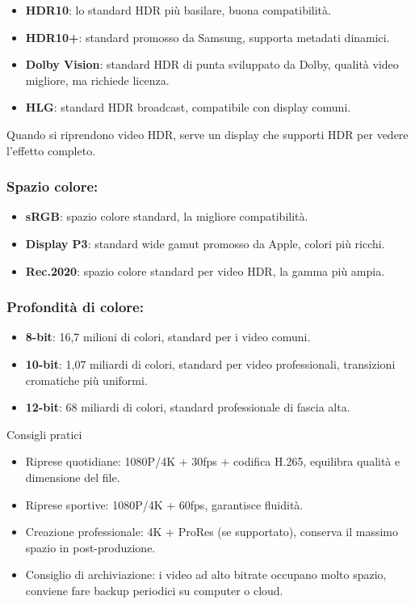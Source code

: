 \begin{itemize}
  \item \textbf{HDR10}: lo standard HDR più basilare, buona compatibilità.
  \item \textbf{HDR10+}: standard promosso da Samsung, supporta metadati dinamici.
  \item \textbf{Dolby Vision}: standard HDR di punta sviluppato da Dolby, qualità video migliore, ma richiede licenza.
  \item \textbf{HLG}: standard HDR broadcast, compatibile con display comuni.
\end{itemize}

Quando si riprendono video HDR, serve un display che supporti HDR per vedere l'effetto completo.


\subsubsection*{Spazio colore:}

\begin{itemize}
  \item \textbf{sRGB}: spazio colore standard, la migliore compatibilità.
  \item \textbf{Display P3}: standard wide gamut promosso da Apple, colori più ricchi.
  \item \textbf{Rec.2020}: spazio colore standard per video HDR, la gamma più ampia.
\end{itemize}

\subsubsection*{Profondità di colore:}

\begin{itemize}
  \item \textbf{8-bit}: 16,7 milioni di colori, standard per i video comuni.
  \item \textbf{10-bit}: 1,07 miliardi di colori, standard per video professionali, transizioni cromatiche più uniformi.
  \item \textbf{12-bit}: 68 miliardi di colori, standard professionale di fascia alta.
\end{itemize}

\begin{tcbinfo}{Consigli pratici}
\begin{itemize}
  \item Riprese quotidiane: 1080P/4K + 30fps + codifica H.265, equilibra qualità e dimensione del file.
  \item Riprese sportive: 1080P/4K + 60fps, garantisce fluidità.
  \item Creazione professionale: 4K + ProRes (se supportato), conserva il massimo spazio in post-produzione.
  \item Consiglio di archiviazione: i video ad alto bitrate occupano molto spazio, conviene fare backup periodici su computer o cloud.
\end{itemize}

\end{tcbinfo}

